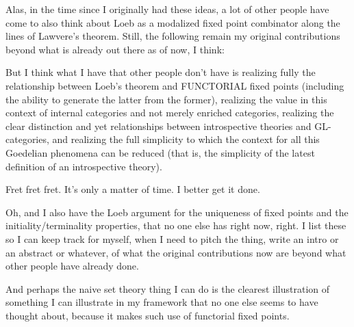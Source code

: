 Alas, in the time since I originally had these ideas, a lot of other people have come to also think about Loeb as a modalized fixed point combinator along the lines of Lawvere's theorem. Still, the following remain my original contributions beyond what is already out there as of now, I think:

But I think what I have that other people don't have is realizing fully the relationship between Loeb's theorem and FUNCTORIAL fixed points (including the ability to generate the latter from the former), realizing the value in this context of internal categories and not merely enriched categories, realizing the clear distinction and yet relationships between introspective theories and GL-categories, and realizing the full simplicity to which the context for all this Goedelian phenomena can be reduced (that is, the simplicity of the latest definition of an introspective theory).

Fret fret fret. It's only a matter of time. I better get it done.

Oh, and I also have the Loeb argument for the uniqueness of fixed points and the initiality/terminality properties, that no one else has right now, right. I list these so I can keep track for myself, when I need to pitch the thing, write an intro or an abstract or whatever, of what the original contributions now are beyond what other people have already done.

And perhaps the naive set theory thing I can do is the clearest illustration of something I can illustrate in my framework that no one else seems to have thought about, because it makes such use of functorial fixed points.